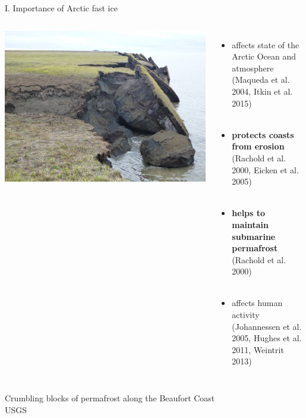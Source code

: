 \documentclass[8pt]{beamer}
\newcommand\Fontvi{\fontsize{6}{7.2}\selectfont}
\begin{document}
\setwatermark{\fontsize{125pt}{125pt}\selectfont{}}
\begin{frame}[fragile]{I. Importance of Arctic fast ice}
	\begin{columns}
		\includegraphics[width=1\textwidth]{./img/Coastal_erosion_.jpg}\\
		\begin{itemize}
			\item affects state of the Arctic Ocean and atmosphere\\(Maqueda et al. 2004, Itkin et al. 2015)\\~\\ 
			\item \textbf{protects coasts from erosion}\\(Rachold et al. 2000, Eicken et al. 2005)\\~\\ 
			\item \textbf{helps to maintain submarine permafrost}\\ (Rachold et al. 2000)\\~\\
			\item affects human activity\\(Johannessen et al. 2005, Hughes et al. 2011, Weintrit 2013)
		\end{itemize}
	\end{columns}
	\Fontvi
	Crumbling blocks of permafrost along the Beaufort Coast\\
	USGS
\end{frame}
\end{document}

